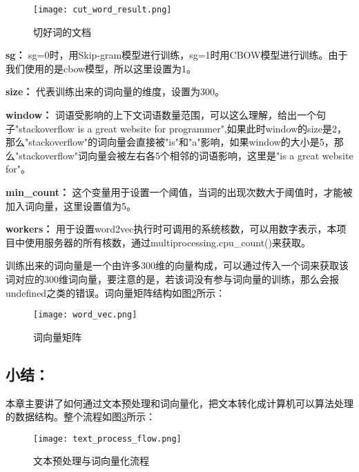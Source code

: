 \begin{figure}[H]
  \begin{center}
    \texttt{[image: cut\_word\_result.png]}
    \caption{切好词的文档}
    \label{cut_word_file}
  \end{center}
\end{figure} 

\textbf{sg：} sg=0时，用Skip-gram模型进行训练，sg=1时用CBOW模型进行训练。由于我们使用的是cbow模型，所以这里设置为1。

\textbf{size：} 代表训练出来的词向量的维度，设置为300。

\textbf{window：} 词语受影响的上下文词语数量范围，可以这么理解，给出一个句子"stackoverflow is a great website for programmer",如果此时window的size是2，那么"stackoverflow"的词向量会直接被"is"和"a"影响，如果window的大小是5，那么"stackoverflow"词向量会被左右各5个相邻的词语影响，这里是"is a great website for"。

\textbf{min\_count：} 这个变量用于设置一个阈值，当词的出现次数大于阈值时，才能被加入词向量，这里设置值为5。

\textbf{workers：} 用于设置word2vec执行时可调用的系统核数，可以用数字表示，本项目中使用服务器的所有核数，通过multiprocessing.cpu\_count()来获取。

训练出来的词向量是一个由许多300维的向量构成，可以通过传入一个词来获取该词对应的300维词向量，要注意的是，若该词没有参与词向量的训练，那么会报undefined之类的错误。词向量矩阵结构如图\ref{word_vec_array}所示：

\begin{figure}[H]
  \begin{center}
    \texttt{[image: word\_vec.png]}
    \caption{词向量矩阵}
    \label{word_vec_array}
  \end{center}
\end{figure} 

\subsection{小结：}
本章主要讲了如何通过文本预处理和词向量化，把文本转化成计算机可以算法处理的数据结构。整个流程如图\ref{pre_process_flow}所示：

\begin{figure}[H]
  \begin{center}
    \texttt{[image: text\_process\_flow.png]}
    \caption{文本预处理与词向量化流程}
    \label{pre_process_flow}
  \end{center}
\end{figure} 

